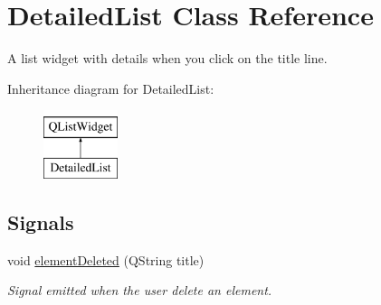 \hypertarget{classDetailedList}{\section{Detailed\+List Class Reference}
\label{classDetailedList}
}


A list widget with details when you click on the title line.  


Inheritance diagram for Detailed\+List\+:\begin{figure}[H]
\begin{center}
\leavevmode
\includegraphics[height=2.000000cm]{classDetailedList}
\end{center}
\end{figure}
\subsection*{Signals}
\begin{DoxyCompactItemize}
\item 
void \hyperlink{classDetailedList_afc406b69efa74f6c03ab0486dc21df67}{element\+Deleted} (Q\+String title)
\begin{DoxyCompactList}\small\item\em Signal emitted when the user delete an element. \end{DoxyCompactList}\end{DoxyCompactItemize}
